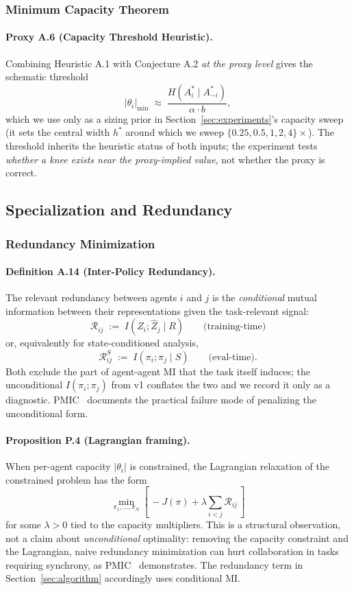 \documentclass[10pt, letterpaper]{article}
\begin{document}
\subsubsection{Minimum Capacity Theorem}

\paragraph{Proxy A.6 (Capacity Threshold Heuristic).} Combining Heuristic A.1 with Conjecture A.2 \emph{at the proxy level} gives the schematic threshold
\[|\theta_i|_\text{min} \;\approx\; \frac{H(A_i^*\mid A_{-i}^*)}{\alpha \cdot b},\]
which we use only as a sizing prior in Section~\ref{sec:experiments}'s capacity sweep (it sets the central width $h^*$ around which we sweep $\{0.25,0.5,1,2,4\}\times$). The threshold inherits the heuristic status of both inputs; the experiment tests \emph{whether a knee exists near the proxy-implied value}, not whether the proxy is correct.

\subsection{Specialization and Redundancy}

\subsubsection{Redundancy Minimization}

\paragraph{Definition A.14 (Inter-Policy Redundancy).} The relevant redundancy between agents $i$ and $j$ is the \emph{conditional} mutual information between their representations given the task-relevant signal:
\[\mathcal{R}_{ij} \;:=\; I(\hat{Z}_i; \hat{Z}_j \mid R) \qquad\text{(training-time)}\]
or, equivalently for state-conditioned analysis,
\[\mathcal{R}^{S}_{ij} \;:=\; I(\pi_i; \pi_j \mid S) \qquad\text{(eval-time)}.\]
Both exclude the part of agent-agent MI that the task itself induces; the unconditional $I(\pi_i; \pi_j)$ from v1 conflates the two and we record it only as a diagnostic. PMIC~\cite{li2022pmic} documents the practical failure mode of penalizing the unconditional form.

\paragraph{Proposition P.4 (Lagrangian framing).} When per-agent capacity $|\theta_i|$ is constrained, the Lagrangian relaxation of the constrained problem has the form
\[\min_{\pi_1,\ldots,\pi_N} \left[\, -J(\pi) + \lambda \sum_{i<j} \mathcal{R}_{ij} \,\right]\]
for some $\lambda > 0$ tied to the capacity multipliers. This is a structural observation, not a claim about \emph{unconditional} optimality: removing the capacity constraint and the Lagrangian, naive redundancy minimization can hurt collaboration in tasks requiring synchrony, as PMIC~\cite{li2022pmic} demonstrates. The redundancy term in Section~\ref{sec:algorithm} accordingly uses conditional MI.
\end{document}
